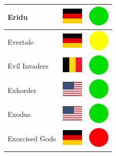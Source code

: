 \documentclass[12pt, a4paper, twoside]{report}
\begin{document}
\begin{center}
\begin{longtable}{|p{5cm}|p{2cm}|p{2cm}|}
Eridu & \includegraphics[width=1cm]{4x3/de} & \includegraphics[width=1cm]{likes/y} \\ \hline
Evertale & \includegraphics[width=1cm]{4x3/de} & \includegraphics[width=1cm]{likes/m} \\ \hline
Evil Invaders & \includegraphics[width=1cm]{4x3/be} & \includegraphics[width=1cm]{likes/y} \\ \hline
Exhorder & \includegraphics[width=1cm]{4x3/us} & \includegraphics[width=1cm]{likes/y} \\ \hline
Exodus & \includegraphics[width=1cm]{4x3/us} & \includegraphics[width=1cm]{likes/y} \\ \hline
Exorcised Gods & \includegraphics[width=1cm]{4x3/de} & \includegraphics[width=1cm]{likes/n} \\ \hline

\end{longtable}
\end{center}
\end{document}
